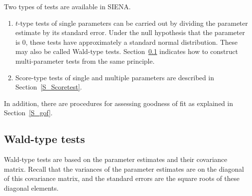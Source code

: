 \documentclass[a4paper,fleqn,11pt]{article}
\newcommand{\+}{\, + \,}
\newcommand{\si}{{\sf SIENA}}
\begin{document}
Two types of tests are available in \si.
\begin{enumerate}
\item $t$-type tests of single parameters can be carried out by
dividing the parameter estimate by its standard error.
Under the null hypothesis that the parameter is 0,
these tests have approximately a standard normal distribution.
These may also be called Wald-type tests.
Section~\ref{Waldtest} indicates how to construct multi-parameter tests
from the same principle.

\item Score-type tests of single and multiple parameters
      are described in Section~\ref{S_Scoretest}.

\end{enumerate}
In addition, there are procedures for assessing goodness of fit
as explained in Section~\ref{S_gof}.

\subsection{Wald-type tests}
\label{Waldtest}

Wald-type tests are based on the parameter estimates
and their covariance matrix.
Recall that the variances of the parameter estimates
are on the diagonal of this covariance matrix, and
the standard errors are the square roots of these diagonal
elements.
\end{document}
